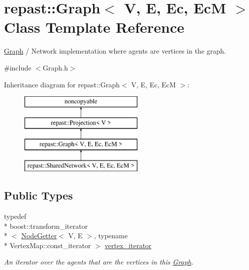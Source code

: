 \hypertarget{classrepast_1_1_graph}{\section{repast\-:\-:Graph$<$ V, E, Ec, Ec\-M $>$ Class Template Reference}
\label{classrepast_1_1_graph}
}


\hyperlink{classrepast_1_1_graph}{Graph} / Network implementation where agents are vertices in the graph.  




{\ttfamily \#include $<$Graph.\-h$>$}

Inheritance diagram for repast\-:\-:Graph$<$ V, E, Ec, Ec\-M $>$\-:\begin{figure}[H]
\begin{center}
\leavevmode
\includegraphics[height=4.000000cm]{classrepast_1_1_graph}
\end{center}
\end{figure}
\subsection*{Public Types}
\begin{DoxyCompactItemize}
\item 
\hypertarget{classrepast_1_1_graph_acee609459f11e02371ae4d8d226aafab}{typedef \\*
boost\-::transform\-\_\-iterator\\*
$<$ \hyperlink{structrepast_1_1_node_getter}{Node\-Getter}$<$ V, E $>$, typename \\*
Vertex\-Map\-::const\-\_\-iterator $>$ \hyperlink{classrepast_1_1_graph_acee609459f11e02371ae4d8d226aafab}{vertex\-\_\-iterator}}\label{classrepast_1_1_graph_acee609459f11e02371ae4d8d226aafab}

\begin{DoxyCompactList}\small\item\em An iterator over the agents that are the vertices in this \hyperlink{classrepast_1_1_graph}{Graph}. \end{DoxyCompactList}\end{DoxyCompactItemize}
